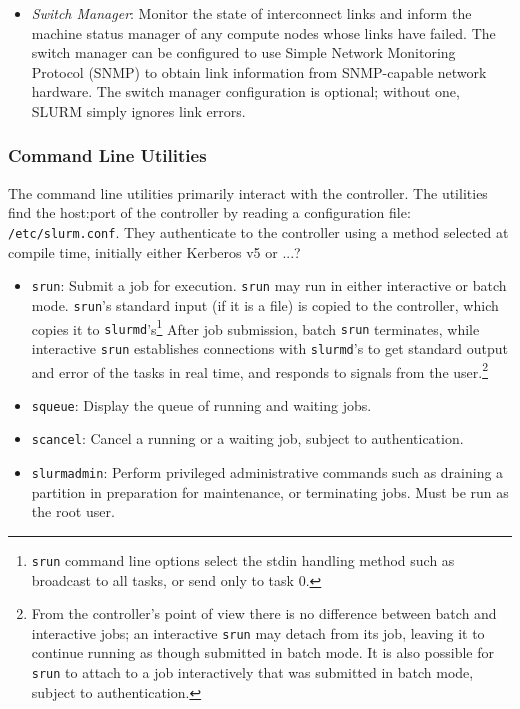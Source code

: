 \begin{itemize}
\item {\em Switch Manager}:  Monitor the state of interconnect links 
and inform the machine status manager of any compute nodes whose links
have failed.  The switch manager can be configured
to use Simple Network Monitoring Protocol (SNMP) to obtain link
information from SNMP-capable network hardware.
The switch manager configuration is optional;  without one, 
SLURM simply ignores link errors.

\end{itemize}

\subsubsection{Command Line Utilities}

The command line utilities primarily interact with the controller.
The utilities find the host:port of the controller by reading a configuration 
file: {\tt /etc/slurm.conf}.
They authenticate to the controller using a method selected at compile
time, initially either Kerberos v5 or ...?


\begin{itemize}
\item {\tt srun}: Submit a job for execution.  {\tt srun} may run in either
interactive or batch mode.  {\tt srun}'s standard input (if it is a file) is 
copied to the controller, which copies it to {\tt slurmd}'s\footnote{{\tt srun}
command line options select the stdin handling method such as broadcast to 
all tasks, or send only to task 0.}
After job submission, batch {\tt srun} terminates, while interactive 
{\tt srun} establishes connections with {\tt slurmd}'s to get standard output 
and error of the tasks in real time, and responds to signals from the 
user.\footnote{From the controller's point of view there is no difference 
between batch and interactive jobs;  an interactive {\tt srun} may detach from 
its job, leaving it to continue running as though submitted in batch mode.
It is also possible for {\tt srun} to attach to a job interactively that
was submitted in batch mode, subject to authentication.}

\item {\tt squeue}: Display the queue of running and waiting jobs.

\item {\tt scancel}: Cancel a running or a waiting job, subject to
authentication.

\item {\tt slurmadmin}: Perform privileged administrative commands
such as draining a partition in preparation for maintenance, or terminating
jobs.  Must be run as the root user.

\end{itemize}

